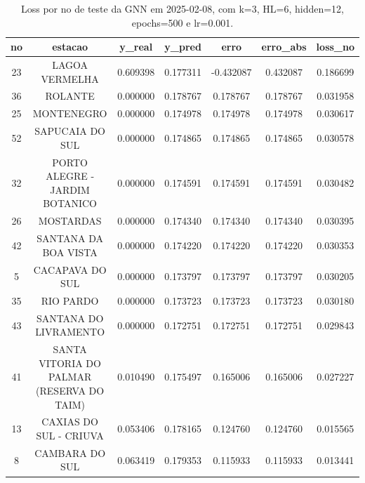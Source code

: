 \begin{table}[h]
\centering
\caption{Loss por no de teste da GNN em 2025-02-08, com k=3, HL=6, hidden=12, epochs=500 e lr=0.001.}
\label{tab:gnn_loss_k3_hl6_h12_e500_d20250208}
\begin{tabular}{ccccccc}
\toprule
no & estacao & y\_real & y\_pred & erro & erro\_abs & loss\_no \\
\midrule
23 & LAGOA VERMELHA & 0.609398 & 0.177311 & -0.432087 & 0.432087 & 0.186699 \\
36 & ROLANTE & 0.000000 & 0.178767 & 0.178767 & 0.178767 & 0.031958 \\
25 & MONTENEGRO & 0.000000 & 0.174978 & 0.174978 & 0.174978 & 0.030617 \\
52 & SAPUCAIA DO SUL & 0.000000 & 0.174865 & 0.174865 & 0.174865 & 0.030578 \\
32 & PORTO ALEGRE - JARDIM BOTANICO & 0.000000 & 0.174591 & 0.174591 & 0.174591 & 0.030482 \\
26 & MOSTARDAS & 0.000000 & 0.174340 & 0.174340 & 0.174340 & 0.030395 \\
42 & SANTANA DA BOA VISTA & 0.000000 & 0.174220 & 0.174220 & 0.174220 & 0.030353 \\
5 & CACAPAVA DO SUL & 0.000000 & 0.173797 & 0.173797 & 0.173797 & 0.030205 \\
35 & RIO PARDO & 0.000000 & 0.173723 & 0.173723 & 0.173723 & 0.030180 \\
43 & SANTANA DO LIVRAMENTO & 0.000000 & 0.172751 & 0.172751 & 0.172751 & 0.029843 \\
41 & SANTA VITORIA DO PALMAR (RESERVA DO TAIM) & 0.010490 & 0.175497 & 0.165006 & 0.165006 & 0.027227 \\
13 & CAXIAS DO SUL - CRIUVA & 0.053406 & 0.178165 & 0.124760 & 0.124760 & 0.015565 \\
8 & CAMBARA DO SUL & 0.063419 & 0.179353 & 0.115933 & 0.115933 & 0.013441 \\
\bottomrule
\end{tabular}
\end{table}
